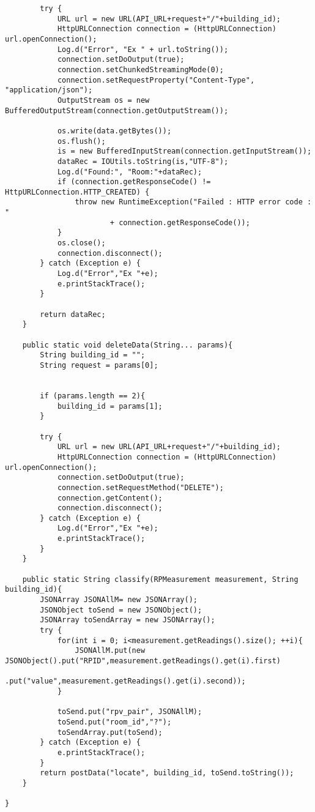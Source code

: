 \begin{lstlisting}
        try {
            URL url = new URL(API_URL+request+"/"+building_id);
            HttpURLConnection connection = (HttpURLConnection) url.openConnection();
            Log.d("Error", "Ex " + url.toString());
            connection.setDoOutput(true);
            connection.setChunkedStreamingMode(0);
            connection.setRequestProperty("Content-Type", "application/json");
            OutputStream os = new BufferedOutputStream(connection.getOutputStream());

            os.write(data.getBytes());
            os.flush();
            is = new BufferedInputStream(connection.getInputStream());
            dataRec = IOUtils.toString(is,"UTF-8");
            Log.d("Found:", "Room:"+dataRec);
            if (connection.getResponseCode() != HttpURLConnection.HTTP_CREATED) {
                throw new RuntimeException("Failed : HTTP error code : "
                        + connection.getResponseCode());
            }
            os.close();
            connection.disconnect();
        } catch (Exception e) {
            Log.d("Error","Ex "+e);
            e.printStackTrace();
        }

        return dataRec;
    }

    public static void deleteData(String... params){
        String building_id = "";
        String request = params[0];


        if (params.length == 2){
            building_id = params[1];
        }

        try {
            URL url = new URL(API_URL+request+"/"+building_id);
            HttpURLConnection connection = (HttpURLConnection) url.openConnection();
            connection.setDoOutput(true);
            connection.setRequestMethod("DELETE");
            connection.getContent();
            connection.disconnect();
        } catch (Exception e) {
            Log.d("Error","Ex "+e);
            e.printStackTrace();
        }
    }

    public static String classify(RPMeasurement measurement, String building_id){
        JSONArray JSONAllM= new JSONArray();
        JSONObject toSend = new JSONObject();
        JSONArray toSendArray = new JSONArray();
        try {
            for(int i = 0; i<measurement.getReadings().size(); ++i){
                JSONAllM.put(new JSONObject().put("RPID",measurement.getReadings().get(i).first)
                        .put("value",measurement.getReadings().get(i).second));
            }

            toSend.put("rpv_pair", JSONAllM);
            toSend.put("room_id","?");
            toSendArray.put(toSend);
        } catch (Exception e) {
            e.printStackTrace();
        }
        return postData("locate", building_id, toSend.toString());
    }

}
\end{lstlisting}
\newpage
